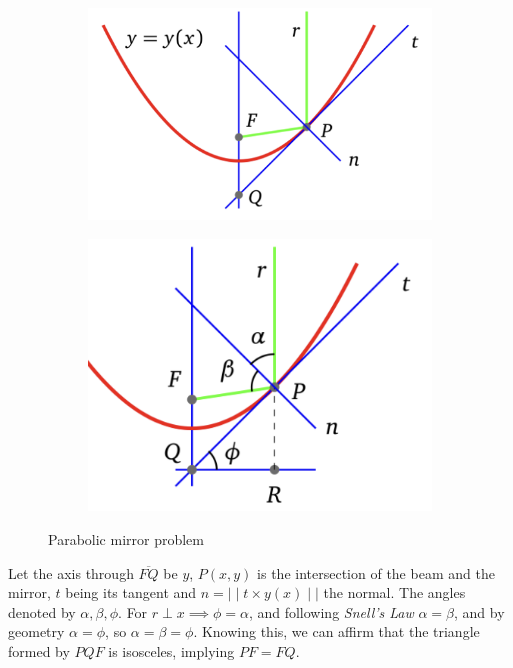 \documentclass[a4paper]{article}
\begin{document}
\begin{figure}[H]
    \centering
    \begin{subfigure}{0.3\textwidth}
        \includegraphics[width=\textwidth]{IMG/prob_mirror1.png}
    \end{subfigure}\hspace{5ex}
    \begin{subfigure}{0.3\textwidth}
        \includegraphics[width=\textwidth]{IMG/prob_mirror2.png}
    \end{subfigure}
    \caption{Parabolic mirror problem}
    \label{fig:prob_mirror}
\end{figure}

Let the axis through $\overline{FQ}$ be $y$, $P(x,y)$ is the intersection of the beam and the mirror, $t$ being its tangent and $n=\mid\mid t\times y(x)\mid\mid$ the normal. The angles denoted by $\alpha,\beta,\phi$. For $r \perp x \implies \phi=\alpha$, and following \textit{Snell's Law} $\alpha=\beta$, and by geometry $\alpha=\phi$, so $\alpha=\beta=\phi$. Knowing this, we can affirm that the triangle formed by $PQF$ is isosceles, implying $PF=FQ$.
\end{document}
